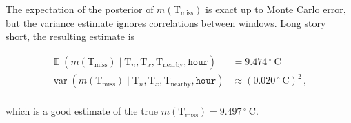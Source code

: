 \documentclass[letter]{article}
\newcommand{\genericdel}[3]{%
      \left#1#3\right#2
    }
\newcommand{\del}[1]{\genericdel(){#1}}
\DeclareMathOperator{\E}{\mathbb{E}}
\DeclareMathOperator{\var}{{var}}
\newcommand{\T}{\mathrm{T}}
\newcommand{\Tn}{\T_{n}}
\newcommand{\Tx}{\T_{x}}
\newcommand{\degreeC}{{}^{\circ}~\mathrm{C}}
\newcommand{\miss}{\mathrm{miss}}
\newcommand{\obs}{\mathrm{nearby}}
\newcommand{\hour}{\mathtt{hour}}
\newcommand{\mean}{m}
\begin{document}
The expectation of the posterior of \(\mean\del{\T_\miss}\) is exact up to Monte Carlo error, but the variance estimate ignores correlations between windows.
Long story short, the resulting estimate is

\begin{equation}
\begin{split}
    \E\del{\mean\del{\T_\miss} \mid \Tn, \Tx, \T_\obs, \hour} 
    &=
    9.474\,\degreeC\\
    \var\del{\mean\del{\T_\miss} \mid \Tn, \Tx, \T_\obs, \hour} 
    &\approx \del{0.020\,\degreeC}^2\,, \\
\end{split}
\end{equation}

which is a good estimate of the true \(\mean\del{\T_\miss} = 9.497\,\degreeC\).
    



    
    



    
    
\end{document}
